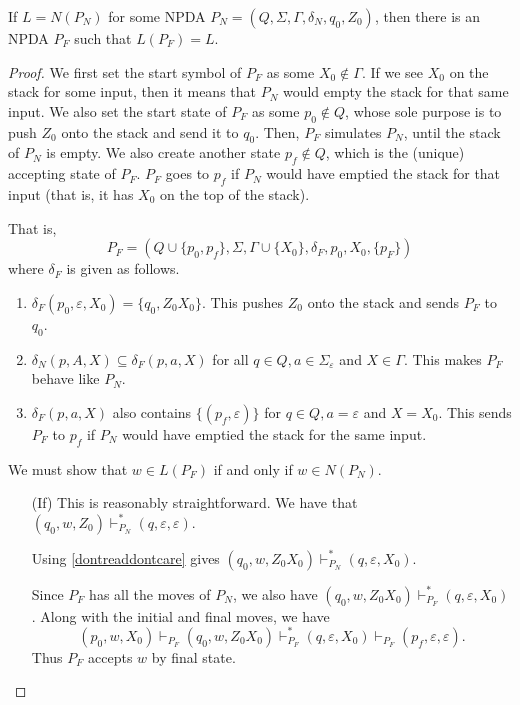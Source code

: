 \begin{lemma}
\label{finalifemptystk}
If $L=N(P_N)$ for some NPDA $P_N=(Q,\Sigma,\Gamma,\delta_N,q_0,Z_0)$, then there is an NPDA $P_F$ such that $L(P_F)=L$.
\end{lemma}
\begin{proof}
We first set the start symbol of $P_F$ as some $X_0\not\in\Gamma$. If we see $X_0$ on the stack for some input, then it means that $P_N$ would empty the stack for that same input. We also set the start state of $P_F$ as some $p_0\not\in Q$, whose sole purpose is to push $Z_0$ onto the stack and send it to $q_0$. Then, $P_F$ simulates $P_N$, until the stack of $P_N$ is empty. We also create another state $p_f\not\in Q$, which is the (unique) accepting state of $P_F$. $P_F$ goes to $p_f$ if $P_N$ would have emptied the stack for that input (that is, it has $X_0$ on the top of the stack).

That is, $$P_F=(Q\cup\{p_0,p_f\}, \Sigma, \Gamma\cup\{X_0\}, \delta_F, p_0, X_0, \{p_F\})$$where $\delta_F$ is given as follows.
\begin{enumerate}
    \item $\delta_F(p_0,\varepsilon,X_0)=\{q_0, Z_0X_0\}$. This pushes $Z_0$ onto the stack and sends $P_F$ to $q_0$.
    \item $\delta_N(p,A,X)\subseteq\delta_F(p,a,X)$ for all $q\in Q, a\in\Sigma_\varepsilon$ and $X\in\Gamma$. This makes $P_F$ behave like $P_N$.
    \item $\delta_F(p,a,X)$ also contains $\{(p_f,\varepsilon)\}$ for $q\in Q, a=\varepsilon$ and $X=X_0$. This sends $P_F$ to $p_f$ if $P_N$ would have emptied the stack for the same input.
\end{enumerate}

We must show that $w\in L(P_F)$ if and only if $w\in N(P_N)$.
\begin{itemize}
    \item[(If)] This is reasonably straightforward. We have that $(q_0,w,Z_0)\vdash^*_{P_N}(q,\varepsilon,\varepsilon)$.
    
    Using \ref{dontreaddontcare} gives $(q_0,w,Z_0X_0)\vdash^*_{P_N} (q,\varepsilon,X_0)$.
    
    Since $P_F$ has all the moves of $P_N$, we also have $(q_0,w,Z_0X_0)\vdash^*_{P_F} (q,\varepsilon,X_0)$. Along with the initial and final moves, we have
    $$(p_0,w,X_0)\vdash_{P_F}(q_0,w,Z_0X_0)\vdash^*_{P_F} (q,\varepsilon,X_0)\vdash_{P_F}(p_f,\varepsilon,\varepsilon).$$
    Thus $P_F$ accepts $w$ by final state.
    

\end{itemize}
\end{proof}

